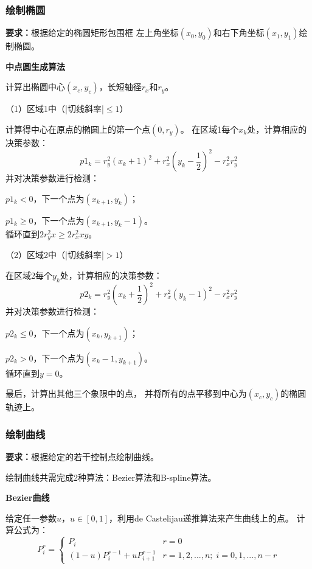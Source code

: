 \documentclass[a4paper,UTF8]{article}
\begin{document}
\subsubsection{绘制椭圆}
\textbf{要求：}根据给定的椭圆矩形包围框
左上角坐标$(x_0,y_0)$和右下角坐标$(x_1,y_1)$绘制椭圆。

\textbf{中点圆生成算法}

计算出椭圆中心$(x_c,y_c)$，长短轴径$r_x$和$r_y$。

（1）区域1中（|切线斜率|$\leqslant 1$）

计算得中心在原点的椭圆上的第一个点$(0,r_y)$。
在区域1每个$x_k$处，计算相应的决策参数：
\begin{equation*}
    p1_{k}=r_y^2(x_k+1)^2+r_x^2(y_k-\frac{1}{2})^2-r_x^2r_y^2
\end{equation*}
并对决策参数进行检测：

$p1_k<0$，下一个点为$(x_{k+1},y_k)$；

$p1_k\geqslant 0$，下一个点为$(x_{k+1},y_k-1)$。
\\循环直到$2r_y^2x\geqslant 2r_x^2xy$。

（2）区域2中（|切线斜率|$>1$）

在区域2每个$y_k$处，计算相应的决策参数：
\begin{equation*}
    p2_{k}=r_y^2(x_k+\frac{1}{2})^2+r_x^2(y_k-1)^2-r_x^2r_y^2
\end{equation*}
并对决策参数进行检测：

$p2_k\leqslant 0$，下一个点为$(x_k,y_{k+1})$；

$p2_k>0$，下一个点为$(x_k-1,y_{k+1})$。
\\循环直到$y=0$。

最后，计算出其他三个象限中的点，
并将所有的点平移到中心为$(x_c,y_c)$的椭圆轨迹上。


\subsubsection{绘制曲线}
\textbf{要求：}根据给定的若干控制点绘制曲线。

绘制曲线共需完成2种算法：Bezier算法和B-spline算法。

\textbf{Bezier曲线}

给定任一参数$u$，$u\in [0,1]$，利用de Castelijau递推算法来产生曲线上的点。
计算公式为：
\begin{equation*}
    P_i^r=
    \begin{cases}
        P_i & r=0\\
        (1-u)P_i^{r-1}+uP_{i+1}^{r-1} & r=1,2,...,n;\; i=0,1,...,n-r
    \end{cases}
\end{equation*}
\end{document}
